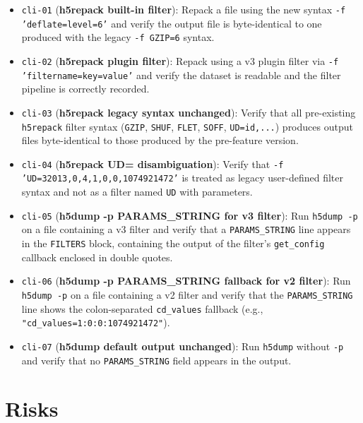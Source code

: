 \documentclass[../HDF5_RFC.tex]{subfiles}
\begin{document}
\begin{itemize}
\item \texttt{cli-01} (\textbf{h5repack built-in filter}): Repack a file using the
  new syntax \texttt{-f 'deflate=level=6'} and verify the output file is
  byte-identical to one produced with the legacy \texttt{-f GZIP=6} syntax.
\item \texttt{cli-02} (\textbf{h5repack plugin filter}): Repack using a v3 plugin
  filter via \texttt{-f 'filtername=key=value'} and verify the dataset is
  readable and the filter pipeline is correctly recorded.
\item \texttt{cli-03} (\textbf{h5repack legacy syntax unchanged}): Verify that all
  pre-existing \texttt{h5repack} filter syntax (\texttt{GZIP}, \texttt{SHUF},
  \texttt{FLET}, \texttt{SOFF}, \texttt{UD=id,...}) produces output files
  byte-identical to those produced by the pre-feature version.
\item \texttt{cli-04} (\textbf{h5repack UD= disambiguation}): Verify that
  \texttt{-f 'UD=32013,0,4,1,0,0,1074921472'} is treated as legacy user-defined
  filter syntax and not as a filter named \texttt{UD} with parameters.
\item \texttt{cli-05} (\textbf{h5dump -p PARAMS\_STRING for v3 filter}): Run
  \texttt{h5dump -p} on a file containing a v3 filter and verify that a
  \texttt{PARAMS\_STRING} line appears in the \texttt{FILTERS} block, containing
  the output of the filter's \texttt{get\_config} callback enclosed in double
  quotes.
\item \texttt{cli-06} (\textbf{h5dump -p PARAMS\_STRING fallback for v2 filter}):
  Run \texttt{h5dump -p} on a file containing a v2 filter and verify that the
  \texttt{PARAMS\_STRING} line shows the colon-separated \texttt{cd\_values} fallback
  (e.g., \texttt{"cd\_values=1:0:0:1074921472"}).
\item \texttt{cli-07} (\textbf{h5dump default output unchanged}): Run \texttt{h5dump}
  without \texttt{-p} and verify that no \texttt{PARAMS\_STRING} field appears in the
  output.
\end{itemize}



\section{Risks}
\label{sec:risks}
\end{document}
